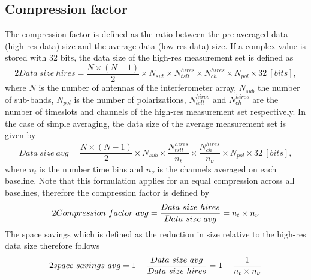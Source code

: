 \documentclass[useAMS,usenatbib]{mn2e}
\begin{document}
\subsection{Compression factor}
The compression factor is defined as the ratio between the pre-averaged  data (high-res data) size and the average data (low-res data) size.
If a complex value is stored with 32 bits,  the data size of the high-res measurement set is defined as
\begin{equation}{2}
Data~size~hires   = \frac{N\times(N-1)}{2}\times N_{sub}  \times N_{tslt}^{hires} \times N_{ch}^{hires}\times N_{pol}\times 32 ~[bits]
,\label{eq:memorychap4hires}
\end{equation}
where  $N$ is the number of antennas of the interferometer array, $N_{sub}$ the number of 
sub-bands, $N_{pol}$ is the number of polarizations, $N_{tslt}^{hires}$ and $N_{ch}^{hires}$ are the number
of timeslots and channels of the high-res  measurement set respectively. 
In the case of simple averaging, the data size of the average measurement set is given by
\begin{equation}
Data~size~avg = \frac{N\times(N-1)}{2}\times N_{sub}  \times \frac{N_{tslt}^{hires}}{n_t} \times \frac{N_{ch}^{hires}}{n_{\nu}}\times N_{pol}\times 32 ~[bits],\label{eq:memorychap4}
\end{equation} 
where $n_t$ is the number time bins and  $n_{\nu}$ is the channels  averaged on each baseline.
Note that this formulation applies for an equal compression across all baselines, therefore the compression factor is defined by
\begin{equation}{2}
Compression~factor~avg = \frac{Data~size~hires}{Data~size~avg}\\
		      =n_t\times n_{\nu}
\end{equation} 
The space savings which is defined as the reduction in size relative to the high-res data size therefore follows
\begin{equation}{2}
space~savings~avg = 1-\frac{Data~size~avg}{Data~size~hires}\\
		      =1-\frac{1}{n_t\times n_{\nu}}
\end{equation} 
\end{document}
